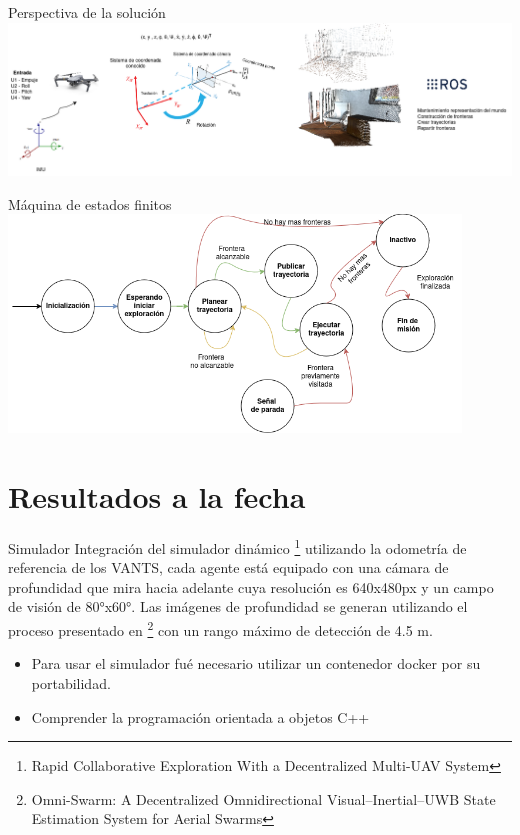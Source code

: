 \documentclass[24pt,aspectratio=169]{beamer}
\begin{document}
\begin{frame}{Perspectiva de la solución}
  \centering
  \bigskip %
  \includegraphics[width=15cm]{big_picture}\\
\end{frame}

\begin{frame}{Máquina de estados finitos}
  \centering
  \bigskip %
  \includegraphics[width=12cm]{FSM}\\
\end{frame}

\section{Resultados a la fecha}

\begin{frame}{Simulador}
  \small
  Integración del simulador dinámico \cite{RACER2022} \footnote{\scriptsize Rapid Collaborative Exploration With a Decentralized Multi-UAV System} utilizando la odometría de referencia de los VANTS, cada agente está equipado con una cámara de profundidad que mira hacia adelante cuya resolución es 640x480px y un campo de visión de 80°x60°. Las imágenes de profundidad se generan utilizando el proceso presentado en \cite{OMNI2022} \footnote{\scriptsize Omni-Swarm: A Decentralized Omnidirectional Visual–Inertial–UWB State Estimation System for Aerial Swarms} con un rango máximo de detección de 4.5 m.
  \begin{itemize}
  \item Para usar el simulador fué necesario utilizar un contenedor docker por su portabilidad.
  \item Comprender la programación orientada a objetos C++
  \end{itemize}
\end{frame}
\end{document}
